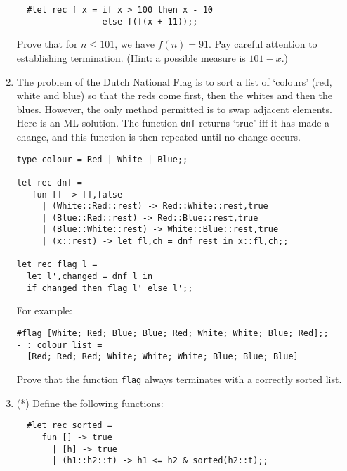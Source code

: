 \begin{enumerate}
\begin{boxed}\begin{verbatim}
  #let rec f x = if x > 100 then x - 10
                 else f(f(x + 11));;
\end{verbatim}\end{boxed}

Prove that for $n \leq 101$, we have $f(n) = 91$. Pay careful attention to
establishing termination. (Hint: a possible measure is $101 - x$.)

\item The problem of the Dutch National Flag is to sort a list of `colours'
(red, white and blue) so that the reds come first, then the whites and then the
blues. However, the only method permitted is to swap adjacent elements. Here is
an ML solution. The function {\tt dnf} returns `true' iff it has made a change,
and this function is then repeated until no change occurs.

\begin{boxed}\begin{verbatim}
type colour = Red | White | Blue;;

let rec dnf =
   fun [] -> [],false
     | (White::Red::rest) -> Red::White::rest,true
     | (Blue::Red::rest) -> Red::Blue::rest,true
     | (Blue::White::rest) -> White::Blue::rest,true
     | (x::rest) -> let fl,ch = dnf rest in x::fl,ch;;

let rec flag l =
  let l',changed = dnf l in
  if changed then flag l' else l';;
\end{verbatim}\end{boxed}

\noindent For example:

\begin{boxed}\begin{verbatim}
#flag [White; Red; Blue; Blue; Red; White; White; Blue; Red];;
- : colour list =
  [Red; Red; Red; White; White; White; Blue; Blue; Blue]
\end{verbatim}\end{boxed}

Prove that the function {\tt flag} always terminates with a correctly sorted
list.

\item (*) Define the following functions:

\begin{boxed}\begin{verbatim}
  #let rec sorted =
     fun [] -> true
       | [h] -> true
       | (h1::h2::t) -> h1 <= h2 & sorted(h2::t);;


\end{verbatim}
\end{boxed}
\end{enumerate}
